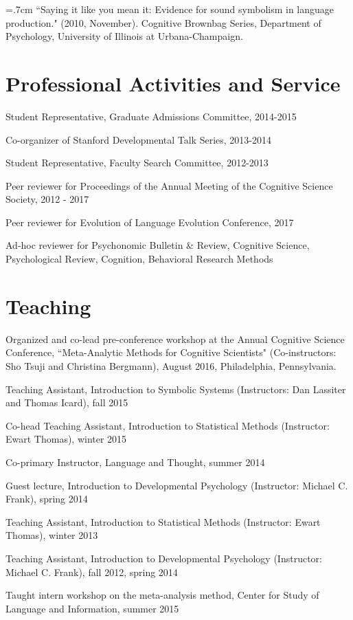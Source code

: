 \documentclass[letterpaper]{article}
\renewenvironment{itemize}{
  \begin{list}{}{
    \setlength{\leftmargin}{1.5em}
  }
}{
  \end{list}
}
\begin{document}
\hangindent=.7cm ``Saying it like you mean it: Evidence for sound symbolism in language production." (2010, November). Cognitive Brownbag Series, Department of Psychology, University of Illinois at Urbana-Champaign.

 
 \singlespacing


\section*{Professional Activities and Service}
\begin{itemize}
\item Student Representative, Graduate Admissions Committee, 2014-2015
\item Co-organizer of Stanford Developmental Talk Series, 2013-2014
\item Student Representative, Faculty Search Committee, 2012-2013
\item Peer reviewer for Proceedings of the Annual Meeting of the Cognitive Science Society, 2012 - 2017
\item Peer reviewer for Evolution of Language Evolution Conference, 2017
\item Ad-hoc reviewer for Psychonomic Bulletin \& Review, Cognitive Science, Psychological Review, Cognition, Behavioral Research Methods
\end{itemize}

\section*{Teaching}
\begin{itemize}
\item Organized and co-lead pre-conference workshop at the Annual Cognitive Science Conference, ``Meta-Analytic Methods for Cognitive Scientists" (Co-instructors: Sho Tsuji and Christina Bergmann), August 2016, Philadelphia, Pennsylvania. 
\item Teaching Assistant, Introduction to Symbolic Systems (Instructors: Dan Lassiter and Thomas Icard), fall 2015
\item Co-head Teaching Assistant, Introduction to Statistical Methods (Instructor: Ewart Thomas), winter 2015
\item Co-primary Instructor, Language and Thought, summer 2014
\item Guest lecture, Introduction to Developmental Psychology (Instructor: Michael C. Frank), spring 2014
\item Teaching Assistant, Introduction to Statistical Methods (Instructor: Ewart Thomas), winter 2013
\item Teaching Assistant, Introduction to Developmental Psychology (Instructor: Michael C. Frank), fall 2012, spring 2014
\item Taught intern workshop on the meta-analysis method, Center for Study of Language and Information, summer 2015

\end{itemize}
\end{document}
